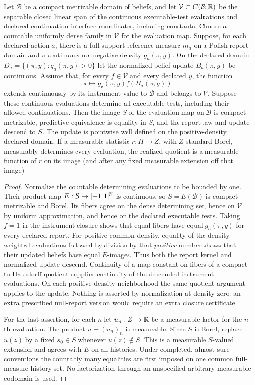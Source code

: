 \begin{proposition}\label{prop:quotient}
Let $\mathcal B$ be a compact metrizable domain of beliefs, and let $\mathcal V\subset C(\mathcal B;\mathbb R)$ be the separable closed linear span of the continuous executable-test evaluations and declared continuation-interface coordinates, including constants. Choose a countable uniformly dense family in $\mathcal V$ for the evaluation map. Suppose, for each declared action $a$, there is a full-support reference measure $m_a$ on a Polish report domain and a continuous nonnegative density $g_a(\pi,y)$. On the declared domain $D_a=\{(\pi,y):g_a(\pi,y)>0\}$ let the normalized belief update $B_a(\pi,y)$ be continuous. Assume that, for every $f\in\mathcal V$ and every declared $y$, the function
\[
 \pi\longmapsto g_a(\pi,y) f(B_a(\pi,y))
\]
extends continuously by its instrument value to $\mathcal B$ and belongs to $\mathcal V$. Suppose these continuous evaluations determine all executable tests, including their allowed continuations. Then the image $S$ of the evaluation map on $\mathcal B$ is compact metrizable, predictive equivalence is equality in $S$, and the report law and update descend to $S$. The update is pointwise well defined on the positive-density declared domain. If a measurable statistic $r:H\to Z$, with $Z$ standard Borel, measurably determines every evaluation, the realized quotient is a measurable function of $r$ on its image (and after any fixed measurable extension off that image).
\end{proposition}
\begin{proof}
Normalize the countable determining evaluations to be bounded by one. Their product map $E:\mathcal B\to[-1,1]^{\mathbb N}$ is continuous, so $S=E(\mathcal B)$ is compact metrizable and Borel. Its fibers agree on the dense determining set, hence on $\mathcal V$ by uniform approximation, and hence on the declared executable tests. Taking $f=1$ in the instrument closure shows that equal fibers have equal $g_a(\pi,y)$ for every declared report. For positive common density, equality of the density-weighted evaluations followed by division by that \emph{positive} number shows that their updated beliefs have equal $E$-images. Thus both the report kernel and normalized update descend. Continuity of a map constant on fibers of a compact-to-Hausdorff quotient supplies continuity of the descended instrument evaluations. On each positive-density neighborhood the same quotient argument applies to the update. Nothing is asserted by normalization at density zero; an extra prescribed null-report version would require an extra closure certificate.

For the last assertion, for each $n$ let $u_n:Z\to\mathbb R$ be a measurable factor for the $n$th evaluation. The product $u=(u_n)_n$ is measurable. Since $S$ is Borel, replace $u(z)$ by a fixed $s_0\in S$ whenever $u(z)\notin S$. This is a measurable $S$-valued extension and agrees with $E$ on all histories. Under completed, almost-sure conventions the countably many equalities are first imposed on one common full-measure history set. No factorization through an unspecified arbitrary measurable codomain is used.
\end{proof}

